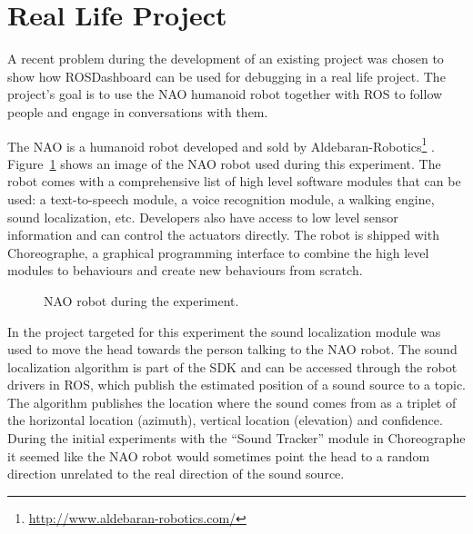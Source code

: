 \section{Real Life Project}
\label{nao_case}
A recent problem during the development of an existing project was chosen to show how ROSDashboard can be used for debugging in a real life project. The project's goal is to use the NAO humanoid robot together with ROS to follow people and engage in conversations with them.

The NAO is a humanoid robot developed and sold by Aldebaran-Robotics\footnote{\url{http://www.aldebaran-robotics.com/}} \cite{Gouaillier2008}. Figure~\ref{nao_coffee} shows an image of the NAO robot used during this experiment. The robot comes with a comprehensive list of high level software modules that can be used: a text-to-speech module, a voice recognition module, a walking engine, sound localization, etc. Developers also have access to low level sensor information and can control the actuators directly. The robot is shipped with Choreographe, a graphical programming interface to combine the high level modules to behaviours and create new behaviours from scratch.

\begin{figure}[htpb]
  \centering
  \caption{NAO robot during the experiment.}
  \label{nao_coffee}
\end{figure}

In the project targeted for this experiment the sound localization module was used to move the head towards the person talking to the NAO robot. The sound localization algorithm is part of the SDK and can be accessed through the robot drivers in ROS, which publish the estimated position of a sound source to a topic. The algorithm publishes the location where the sound comes from as a triplet of the horizontal location (azimuth), vertical location (elevation) and confidence. During the initial experiments with the ``Sound Tracker'' module in Choreographe it seemed like the NAO robot would sometimes point the head to a random direction unrelated to the real direction of the sound source.

